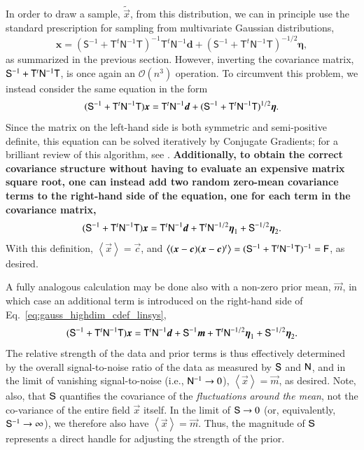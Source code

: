 \documentclass[twocolumn]{aa}
\renewcommand{\d}[0]{\vec{d}}
\newcommand{\x}[0]{\vec{x}}
\newcommand{\m}[0]{\vec{m}}
\newcommand{\F}[0]{\tens{F}}
\newcommand{\T}[0]{\tens{T}}
\newcommand{\N}[0]{\tens{N}}
\renewcommand{\S}[0]{\tens{S}}
\begin{document}
In order to draw a sample, $\tilde{\x}$, from this distribution, we
can in principle use the standard prescription for sampling from
multivariate Gaussian distributions, 
\begin{equation}
	\boldsymbol x=(\mathsf S^{-1}+\mathsf T^t\mathsf N^{-1}\mathsf T)^{-1}
	\mathsf T^t\mathsf N^{-1}\boldsymbol d+(\mathsf S^{-1}+\mathsf T^t\mathsf N^{-1}\mathsf T)^{-1/2}\boldsymbol\eta,
\end{equation}
as summarized in the previous
section. However, inverting the covariance matrix, $\S^{-1}+
\T^t\N^{-1}\T$, is once again an $\mathcal{O}(n^3)$ operation. To
circumvent this problem, we instead consider the same equation in the
form
\begin{equation}
  (\S^{-1} + \T^t\N^{-1}\T)\x = \T^t\N^{-1}\d
	+(\mathsf S^{-1}+\mathsf T^t\mathsf N^{-1}\mathsf T)^{1/2}\boldsymbol\eta.
  \label{eq:gauss_highdim_cdef_linsys}
\end{equation}
Since the matrix on the left-hand side is both symmetric and
semi-positive definite, this equation can be solved iteratively by
Conjugate Gradients; for a brilliant review of this algorithm, see
\citet{shewchuk:1994}. {\bf Additionally, to obtain the correct
  covariance structure without having to evaluate an expensive matrix square
  root, one can instead add two random zero-mean covariance terms to
  the right-hand side of the equation, one for each term in the
  covariance matrix,}
\begin{equation}
    (\S^{-1} + \T^t\N^{-1}\T)\x = \T^t\N^{-1}\d + \T^t\N^{-1/2}\vec{\eta}_1 +
    \S^{-1/2}\vec{\eta}_2. 
    \label{eq:multigauss}
\end{equation}
With this definition, $\left<\x\right> = \vec{c}$,
and $\left<(\x-\vec{c})(\x-\vec{c})^t\right> = (\S^{-1} + \T^t\N^{-1}\T)^{-1} = \F$, as desired.

A fully analogous calculation may be done also with a non-zero prior
mean, $\m$, in which case an additional term is introduced on
the right-hand side of Eq.~\eqref{eq:gauss_highdim_cdef_linsys},
\begin{equation}
  (\S^{-1} + \T^t\N^{-1}\T)\x = \T^t\N^{-1}\d + \S^{-1}\m + \T^t\N^{-1/2}\vec{\eta}_1 +
    \S^{-1/2}\vec{\eta}_2. 
  \label{eq:gauss_highdim_prior}
\end{equation}
The relative strength of the data and prior terms is thus effectively
determined by the overall signal-to-noise ratio of the data as
measured by $\S$ and $\N$, and in the limit of vanishing
signal-to-noise (i.e., $\N^{-1}\rightarrow0$), $\left<\x\right>=\m$,
as desired. Note, also, that $\S$ quantifies the covariance of the
\emph{fluctuations around the mean}, not the co-variance of the entire
field $\x$ itself. In the limit of $\S\rightarrow0$ (or, equivalently,
$\S^{-1}\rightarrow\infty$), we therefore also have
$\left<\x\right>=\m$. Thus, the magnitude of $\S$ represents a direct
handle for adjusting the strength of the prior.
\end{document}

